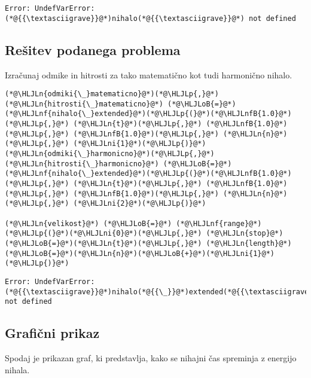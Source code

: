 \documentclass[12pt,a4paper]{article}
\newcommand{\HLJLn}[1]{#1}
\newcommand{\HLJLnf}[1]{\textcolor[RGB]{66,102,213}{#1}}
\newcommand{\HLJLnfB}[1]{\textcolor[RGB]{59,151,46}{#1}}
\newcommand{\HLJLni}[1]{\textcolor[RGB]{59,151,46}{#1}}
\newcommand{\HLJLoB}[1]{\textcolor[RGB]{102,102,102}{\textbf{#1}}}
\newcommand{\HLJLp}[1]{#1}
\begin{document}
\begin{lstlisting}
Error: UndefVarError: (*@{{\textasciigrave}}@*)nihalo(*@{{\textasciigrave}}@*) not defined
\end{lstlisting}


\subsection{Rešitev podanega problema}
Izračunaj odmike in hitrosti za tako matematično kot tudi harmonično nihalo.


\begin{lstlisting}
(*@\HLJLn{odmiki{\_}matematicno}@*)(*@\HLJLp{,}@*) (*@\HLJLn{hitrosti{\_}matematicno}@*) (*@\HLJLoB{=}@*) (*@\HLJLnf{nihalo{\_}extended}@*)(*@\HLJLp{(}@*)(*@\HLJLnfB{1.0}@*)(*@\HLJLp{,}@*) (*@\HLJLn{t}@*)(*@\HLJLp{,}@*) (*@\HLJLnfB{1.0}@*)(*@\HLJLp{,}@*) (*@\HLJLnfB{1.0}@*)(*@\HLJLp{,}@*) (*@\HLJLn{n}@*)(*@\HLJLp{,}@*) (*@\HLJLni{1}@*)(*@\HLJLp{)}@*)
(*@\HLJLn{odmiki{\_}harmonicno}@*)(*@\HLJLp{,}@*) (*@\HLJLn{hitrosti{\_}harmonicno}@*) (*@\HLJLoB{=}@*) (*@\HLJLnf{nihalo{\_}extended}@*)(*@\HLJLp{(}@*)(*@\HLJLnfB{1.0}@*)(*@\HLJLp{,}@*) (*@\HLJLn{t}@*)(*@\HLJLp{,}@*) (*@\HLJLnfB{1.0}@*)(*@\HLJLp{,}@*) (*@\HLJLnfB{1.0}@*)(*@\HLJLp{,}@*) (*@\HLJLn{n}@*)(*@\HLJLp{,}@*) (*@\HLJLni{2}@*)(*@\HLJLp{)}@*)

(*@\HLJLn{velikost}@*) (*@\HLJLoB{=}@*) (*@\HLJLnf{range}@*)(*@\HLJLp{(}@*)(*@\HLJLni{0}@*)(*@\HLJLp{,}@*) (*@\HLJLn{stop}@*)(*@\HLJLoB{=}@*)(*@\HLJLn{t}@*)(*@\HLJLp{,}@*) (*@\HLJLn{length}@*)(*@\HLJLoB{=}@*)(*@\HLJLn{n}@*)(*@\HLJLoB{+}@*)(*@\HLJLni{1}@*)(*@\HLJLp{)}@*)
\end{lstlisting}

\begin{lstlisting}
Error: UndefVarError: (*@{{\textasciigrave}}@*)nihalo(*@{{\_}}@*)extended(*@{{\textasciigrave}}@*) not defined
\end{lstlisting}


\subsection{Grafični prikaz}
Spodaj je prikazan graf, ki predstavlja, kako se nihajni čas spreminja z energijo nihala.
\end{document}
